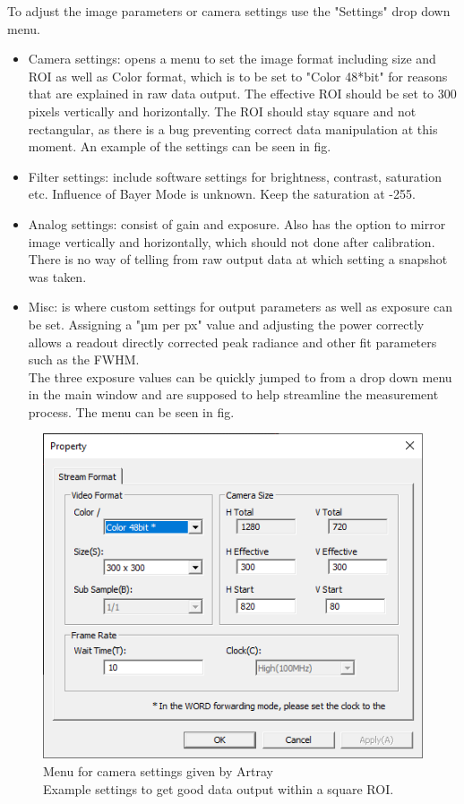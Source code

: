 \documentclass[twoside,openright]{scrreprt}
\begin{document}
To adjust the image parameters or camera settings use the "Settings" drop down menu.
\begin{itemize}
\item Camera settings: opens a menu to set the image format including size and ROI as well as Color format, which is to be set to "Color 48*bit" for reasons that are explained in raw data output. The effective ROI should be set to 300 pixels vertically and horizontally. The ROI should stay square and not rectangular, as there is a bug preventing correct data manipulation at this moment. An example of the settings can be seen in fig. 
\item Filter settings: include software settings for brightness, contrast, saturation etc. Influence of Bayer Mode is unknown. Keep the saturation at -255.
\item Analog settings: consist of gain and exposure. Also has the option to mirror image vertically and horizontally, which should not done after calibration. There is no way of telling from raw output data at which setting a snapshot was taken.
\item Misc: is where custom settings for output parameters as well as exposure can be set. Assigning a "µm per px" value and adjusting the power correctly allows a readout directly corrected peak radiance and other fit parameters such as the FWHM.\\The three exposure values can be quickly jumped to from a drop down menu in the main window and are supposed to help streamline the measurement process. The menu can be seen in fig. 
\end{itemize}

\begin{figure}[hbtp]
\centering
\includegraphics[width = 0.6\linewidth]{images/ArtrayExamplePics/StreamProperties.PNG}
\caption{Menu for camera settings given by Artray\\ Example settings to get good data output within a square ROI.}
\end{figure}
\end{document}

